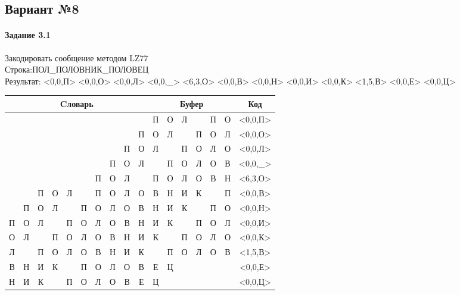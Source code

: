 \documentclass[a4paper, 12pt]{article}
\begin{document}
\pagebreak
\subsection{Вариант №8}
\paragraph{Задание 3.1}

Закодировать сообщение методом LZ77\\
Строка:ПОЛ\_ПОЛОВНИК\_ПОЛОВЕЦ\\
Результат: <0,0,П> <0,0,О> <0,0,Л> <0,0,\_> <6,3,О> <0,0,В> <0,0,Н> <0,0,И> <0,0,К> <1,5,В> <0,0,Е> <0,0,Ц>\\
\begin{table}[h!]
\centering
\begin{tabular}{|c|c|c|c|c|c|c|c|c|c|c|c|c|c|c|c|c|} 
\hline
\multicolumn{10}{|c|}{Cловарь} & \multicolumn{6}{c|}{Буфер} & Код  \\ \hline
  &   &   &   &   &   &   &   &   &   & \cellcolor[HTML]{8CE4F6} П & О & Л &   & П & О & <0,0,П>
\\ \hline
  &   &   &   &   &   &   &   &   & П & \cellcolor[HTML]{8CE4F6} О & Л &   & П & О & Л & <0,0,О>
\\ \hline
  &   &   &   &   &   &   &   & П & О & \cellcolor[HTML]{8CE4F6} Л &   & П & О & Л & О & <0,0,Л>
\\ \hline
  &   &   &   &   &   &   & П & О & Л & \cellcolor[HTML]{8CE4F6}   & П & О & Л & О & В & <0,0,\_>
\\ \hline
  &   &   &   &   &   & \cellcolor[HTML]{FFFF00} П & \cellcolor[HTML]{FFFF00} О & \cellcolor[HTML]{FFFF00} Л &   & \cellcolor[HTML]{FFFF00} П & \cellcolor[HTML]{FFFF00} О & \cellcolor[HTML]{FFFF00} Л & \cellcolor[HTML]{8CE4F6} О & В & Н & <6,3,О>
\\ \hline
  &   & П & О & Л &   & П & О & Л & О & \cellcolor[HTML]{8CE4F6} В & Н & И & К &   & П & <0,0,В>
\\ \hline
  & П & О & Л &   & П & О & Л & О & В & \cellcolor[HTML]{8CE4F6} Н & И & К &   & П & О & <0,0,Н>
\\ \hline
П & О & Л &   & П & О & Л & О & В & Н & \cellcolor[HTML]{8CE4F6} И & К &   & П & О & Л & <0,0,И>
\\ \hline
О & Л &   & П & О & Л & О & В & Н & И & \cellcolor[HTML]{8CE4F6} К &   & П & О & Л & О & <0,0,К>
\\ \hline
Л & \cellcolor[HTML]{FFFF00}   & \cellcolor[HTML]{FFFF00} П & \cellcolor[HTML]{FFFF00} О & \cellcolor[HTML]{FFFF00} Л & \cellcolor[HTML]{FFFF00} О & В & Н & И & К & \cellcolor[HTML]{FFFF00}   & \cellcolor[HTML]{FFFF00} П & \cellcolor[HTML]{FFFF00} О & \cellcolor[HTML]{FFFF00} Л & \cellcolor[HTML]{FFFF00} О & \cellcolor[HTML]{8CE4F6} В & <1,5,В>
\\ \hline
В & Н & И & К &   & П & О & Л & О & В & \cellcolor[HTML]{8CE4F6} Е & Ц &   &   &   &   & <0,0,Е>
\\ \hline
Н & И & К &   & П & О & Л & О & В & Е & \cellcolor[HTML]{8CE4F6} Ц &   &   &   &   &   & <0,0,Ц>
\\ \hline
\end{tabular}
\end{table}
\end{document}
